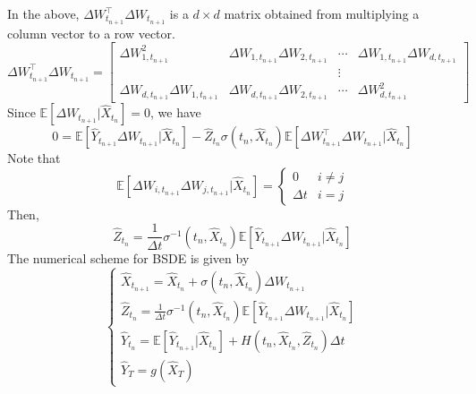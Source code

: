 \documentclass[11pt]{book}
\begin{document}
In the above, $\Delta W_{t_{n+1}}^\intercal\Delta W_{t_{n+1}}$ is a $d\times d$ matrix obtained from multiplying a column vector to a row vector. 
\[
\Delta W_{t_{n+1}}^\intercal\Delta W_{t_{n+1}}
=\left[
\begin{matrix}
    \Delta W_{1,t_{n+1}}^2&\Delta W_{1,t_{n+1}}\Delta W_{2,t_{n+1}}&\cdots &\Delta W_{1,t_{n+1}}\Delta W_{d,t_{n+1}}\\
    &&\vdots&\\
    \Delta W_{d,t_{n+1}}\Delta W_{1,t_{n+1}}&\Delta W_{d,t_{n+1}}\Delta W_{2,t_{n+1}}&\cdots &\Delta W_{d,t_{n+1}}^2
\end{matrix}
\right]
\]
Since $\mathbb{E}[\Delta W_{t_{n+1}}|\hat{X}_{t_n}]=0$, we have 
\begin{equation}
    0= \mathbb{E}[\hat{Y}_{t_{n+1}}\Delta W_{t_{n+1}}|\hat{X}_{t_n}] - \hat{Z}_{t_n}\sigma(t_n,\hat{X}_{t_n}) \mathbb{E}[\Delta W_{t_{n+1}}^\intercal\Delta W_{t_{n+1}}|\hat{X}_{t_n}]
\end{equation}
Note that 
\[
\mathbb{E}[\Delta W_{i,t_{n+1}}\Delta W_{j,t_{n+1}}|\hat{X}_{t_n}]=\begin{cases}
    0&i\neq j\\
    \Delta t & i=j
\end{cases}
\]
Then, 
\begin{equation}
    \hat{Z}_{t_n}= \frac{1}{\Delta t}\sigma^{-1}(t_n,\hat{X}_{t_n}) \mathbb{E}[\hat{Y}_{t_{n+1}}\Delta W_{t_{n+1}}|\hat{X}_{t_n}]   
\end{equation}
The numerical scheme for BSDE is given by 
\begin{equation}
\label{eqn:BSDE_discrete_Z}
    \begin{cases}
    \hat{X}_{t_{n+1}}=\hat{X}_{t_{n}} + \sigma(t_n,\hat{X}_{t_{n}})\Delta W_{t_{n+1}}\\
    \hat{Z}_{t_n}= \frac{1}{\Delta t}\sigma^{-1}(t_n,\hat{X}_{t_n}) \mathbb{E}[\hat{Y}_{t_{n+1}}\Delta W_{t_{n+1}}|\hat{X}_{t_n}] \\
        \hat{Y}_{t_n} = \mathbb{E}[\hat{Y}_{t_{n+1}}|\hat{X}_{t_n}] +H(t_n,\hat{X}_{t_n},\hat{Z}_{t_n})\Delta t\\
        \hat{Y}_T=g(\hat{X}_T)
    \end{cases}
\end{equation}
\end{document}
